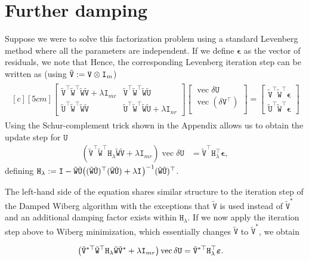 \documentclass[runningheads]{llncs}
\def\tr{^\top}
\def\vec{\operatorname{vec}}
\def\m#1{\ensuremath{\mathtt{#1}}}
\def\mU{\m U}
\def\mV{\m V}
\def\mW{\m W}
\def\verr{\boldsymbol \epsilon}
\def\twiddle#1{{\tilde{#1}}}
\def\tU{\twiddle\mU}
\def\tW{\twiddle\mW}
\def\tV{\twiddle\mV}
\begin{document}
\section{Further damping}
Suppose we were to solve this factorization problem using a standard Levenberg method where all the parameters are independent. If we define $ \verr $ as the vector of residuals, we note that
\dEpsOneUV
Hence, the corresponding Levenberg iteration step can be written as (using $\tV:=\kron{\mV}{\Id m}$)
\begin{align}
\begin{multlined}[c][5cm]
\begin{bmatrix}
\tV \tr \tW \tr \tW \tV + \lambda \m I_{mr} &
\tV \tr \tW \tr \tW \tU \\
\tU \tr \tW \tr \tW \tV &
\tU \tr \tW \tr \tW \tU + \lambda \m I_{nr}
\end{bmatrix}
\begin{bmatrix}
\vec \delta \m U \\
\vec (\delta \m V \tr) \\
\end{bmatrix} =
\begin{bmatrix}
\tV \tr \tW \tr \verr \\
\tU \tr \tW \tr \verr
\end{bmatrix}
\end{multlined}
\end{align}
Using the Schur-complement trick shown in the Appendix allows us to obtain the update step for $\m U$
\begin{align}
\left( \tV \tr \tW \tr \m H_\lambda \tW \tV + \lambda \m I_{mr} \right)
\vec {\delta \m U} &= \tV \tr \m H_\lambda \tr \verr,
\end{align}
defining $\m H_\lambda := 
\m I - \tW \tU \bigl((\tW \tU)\tr(\tW \tU)+\lambda\Id{}\bigr)^{-1}(\tW \tU)\tr$.

The left-hand side of the equation shares similar structure to the iteration step of the Damped Wiberg algorithm \cite{okatani2011efficient} with the exceptions that $\tV$ is used instead of $ \tilde{\m V}^* $ and an additional damping factor exists within $ \m H_\lambda $. If we now apply the iteration step above to Wiberg minimization, which essentially changes $\tV$ to $\tilde{\m V}^*$, we obtain

\begin{align}
\left( \tilde{\m V}^{*\top} \tW \tr \m H_\lambda \tW \tilde{\m V}^* + \lambda \m I_{mr} \right)
\vec {\delta \m U} &= \tilde{\m V}^{*\top} \m H_\lambda \tr \verru.
\end{align}
\end{document}
